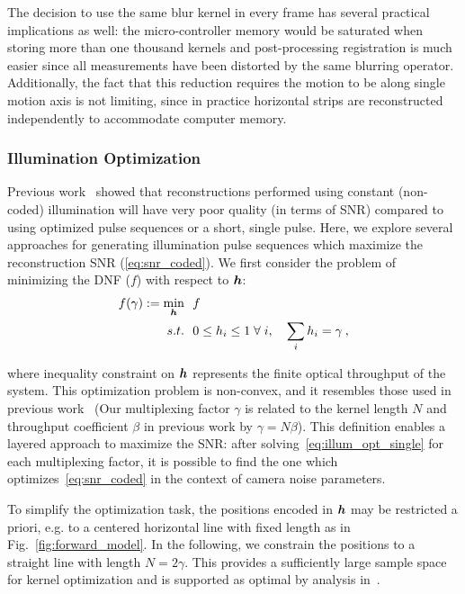 The decision to use the same blur kernel in every frame has several practical implications as well: the micro-controller memory would be saturated when storing more than one thousand kernels and post-processing registration is much easier since all measurements have been distorted by the same blurring operator. Additionally, the fact that this reduction requires the motion to be along single motion axis is not limiting, since in practice horizontal strips are reconstructed independently to accommodate computer memory.

\subsubsection{Illumination Optimization}\label{sec:highthroughput:illum_opt}
Previous work~\cite{raskar2006coded, agrawal2009optimal} showed that reconstructions performed using constant (non-coded) illumination will have very poor quality (in terms of SNR) compared to using optimized pulse sequences or a short, single pulse. Here, we explore several approaches for generating illumination pulse sequences which maximize the reconstruction SNR (\eqref{eq:snr_coded}). We first consider the problem of minimizing the DNF ($f$) with respect to $\bm{h}$:
\begin{align}
    \begin{split}
        \label{eq:illum_opt_single}
        f(\gamma) := \min_{\bm{h}}&~~ f \\
          s.t. &~~0 \leq h_i \leq 1 \; \forall \; i, \quad
          \sum_{i} h_i = \gamma \:,
    \end{split}
\end{align}

\noindent where inequality constraint on $\bm{h}$ represents the finite optical throughput of the system.
This optimization problem is non-convex, and it resembles those used in previous work~\cite{raskar2006coded,agrawal2009optimal,Ma:15} (Our multiplexing factor $\gamma$ is related to the kernel length $N$ and throughput coefficient $\beta$ in previous work by $\gamma = N\beta$). This definition enables a layered approach to maximize the SNR: after solving~\eqref{eq:illum_opt_single} for each multiplexing factor, it is possible to find the one which optimizes~\eqref{eq:snr_coded} in the context of camera noise parameters.

To simplify the optimization task, the positions encoded in $\bm{h}$ may be restricted a priori, e.g. to a centered horizontal line with fixed length as in Fig.~\ref{fig:forward_model}. In the following, we constrain the positions to a straight line with length $N=2\gamma$. This provides a sufficiently large sample space for kernel optimization and is supported as optimal by analysis in~\cite{agrawal2009optimal}.

